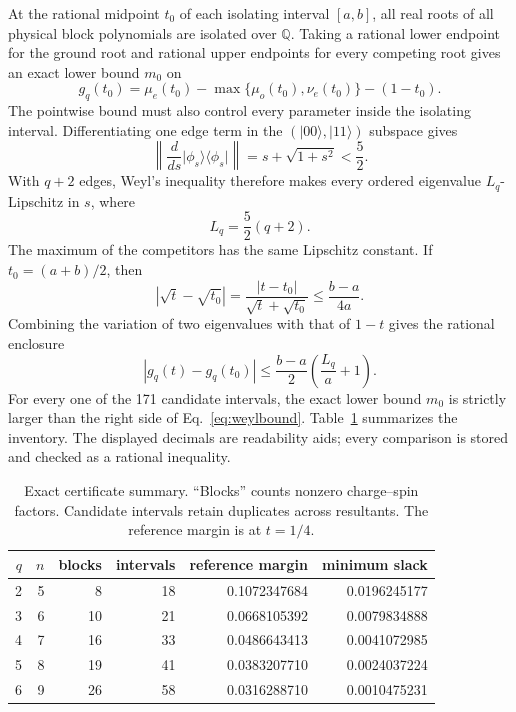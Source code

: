 \documentclass[11pt]{article}
\newcommand{\Q}{\mathbb Q}
\newcommand{\ket}[1]{\lvert #1\rangle}
\newcommand{\bra}[1]{\langle #1\rvert}
\newcommand{\opnorm}[1]{\left\lVert #1\right\rVert}
\begin{document}
At the rational midpoint \(t_0\) of each isolating interval \([a,b]\),
all real roots of all physical block polynomials are isolated over
\(\Q\).  Taking a rational lower endpoint for the ground root and rational
upper endpoints for every competing root gives an exact lower bound
\(m_0\) on
\begin{equation}
 g_q(t_0)=\mu_e(t_0)-\max\{\mu_o(t_0),\nu_e(t_0)\}-(1-t_0).
                                                                    \label{eq:g}
\end{equation}
The pointwise bound must also control every parameter inside the isolating
interval.  Differentiating one edge term in the
\((\ket{00},\ket{11})\) subspace gives
\begin{equation}
 \opnorm{\frac{d}{ds}\ket{\phi_s}\!\bra{\phi_s}}
 =s+\sqrt{1+s^2}<\frac52.                              \label{eq:deriv}
\end{equation}
With \(q+2\) edges, Weyl's inequality therefore makes every ordered
eigenvalue \(L_q\)-Lipschitz in \(s\), where
\begin{equation}
                    L_q=\frac52(q+2).                 \label{eq:L}
\end{equation}
The maximum of the competitors has the same Lipschitz constant.  If
\(t_0=(a+b)/2\), then
\begin{equation}
 |\sqrt t-\sqrt{t_0}|
 =\frac{|t-t_0|}{\sqrt t+\sqrt{t_0}}
 \leq \frac{b-a}{4a}.
\end{equation}
Combining the variation of two eigenvalues with that of \(1-t\) gives the
rational enclosure
\begin{equation}
 |g_q(t)-g_q(t_0)|
 \leq \frac{b-a}{2}\left(\frac{L_q}{a}+1\right).       \label{eq:weylbound}
\end{equation}
For every one of the 171 candidate intervals, the exact lower bound
\(m_0\) is strictly larger than the right side of
Eq.~\eqref{eq:weylbound}.  Table~\ref{tab:cert} summarizes the inventory.
The displayed decimals are readability aids; every comparison is stored
and checked as a rational inequality.

\begin{table}[ht]
\centering
\caption{Exact certificate summary.  ``Blocks'' counts nonzero
charge--spin factors.  Candidate intervals retain duplicates across
resultants.  The reference margin is at \(t=1/4\).}
\label{tab:cert}
\begin{tabular}{@{}rrrrrr@{}}
\toprule
\(q\)&\(n\)&blocks&intervals&reference margin&minimum slack\\
\midrule
2&5& 8&18&0.1072347684&0.0196245177\\
3&6&10&21&0.0668105392&0.0079834888\\
4&7&16&33&0.0486643413&0.0041072985\\
5&8&19&41&0.0383207710&0.0024037224\\
6&9&26&58&0.0316288710&0.0010475231\\
\bottomrule
\end{tabular}
\end{table}
\end{document}
